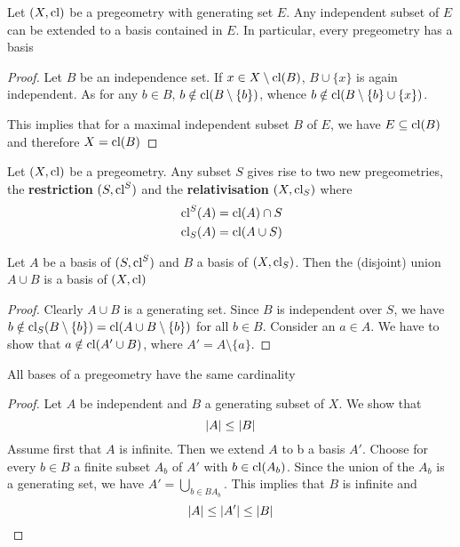 \documentclass[11pt]{article}
\begin{document}
\begin{lemma}[]
Let \((X,\operatorname{\text{cl}})\) be a pregeometry with generating set \(E\). Any independent subset of \(E\) can
be extended to a basis contained in \(E\). In particular, every pregeometry has a basis
\end{lemma}

\begin{proof}
Let \(B\) be an independence set. If \(x\in X\setminus\operatorname{\text{cl}}(B)\), \(B\cup\{x\}\) is again independent. As for
any \(b\in B\), \(b\notin\operatorname{\text{cl}}(B\setminus\{b\})\), whence \(b\notin\operatorname{\text{cl}}(B\setminus\{b\}\cup\{x\})\).

This implies that for a maximal independent subset \(B\) of \(E\), we have \(E\subseteq\operatorname{\text{cl}}(B)\) and
therefore \(X=\operatorname{\text{cl}}(B)\)
\end{proof}

\begin{definition}[]
Let \((X,\operatorname{\text{cl}})\) be a pregeometry. Any subset \(S\) gives rise to two new pregeometries, the
\textbf{restriction} \((S,\operatorname{\text{cl}}^S)\) and the \textbf{relativisation} \((X,\operatorname{\text{cl}}_S)\) where
\begin{align*}
&\operatorname{\text{cl}}^S(A)=\operatorname{\text{cl}}(A)\cap S\\
&\operatorname{\text{cl}}_S(A)=\operatorname{\text{cl}}(A\cup S)
\end{align*}
\end{definition}

\begin{remark}
Let \(A\) be a basis of \((S,\operatorname{\text{cl}}^S)\) and \(B\) a basis of \((X,\operatorname{\text{cl}}_S)\). Then the (disjoint)
union \(A\cup B\) is a basis of \((X,\operatorname{\text{cl}})\)
\end{remark}

\begin{proof}
Clearly \(A\cup B\) is a generating set. Since \(B\) is independent over \(S\), we
have \(b\notin\operatorname{\text{cl}}_S(B\setminus\{b\})=\operatorname{\text{cl}}(A\cup B\setminus\{b\})\) for all \(b\in B\). Consider an \(a\in A\). We have to show
that \(a\notin\operatorname{\text{cl}}(A'\cup B)\), where \(A'=A\setminus\{a\}\).
\end{proof}

\begin{lemma}[]
All bases of a pregeometry have the same cardinality
\end{lemma}

\begin{proof}
Let \(A\) be independent and \(B\) a generating subset of \(X\). We show that
\begin{equation*}
\abs{A}\le\abs{B}
\end{equation*}
Assume first that \(A\) is infinite. Then we extend \(A\) to b a basis \(A'\). Choose for
every \(b\in B\) a finite subset \(A_b\) of \(A'\) with \(b\in\operatorname{\text{cl}}(A_b)\). Since the union of
the \(A_b\) is a generating set, we have \(A'=\bigcup_{b\in BA_b}\). This implies that \(B\) is infinite
and
\begin{equation*}
\abs{A}\le\abs{A'}\le\abs{B}
\end{equation*}
\end{proof}
\end{document}
